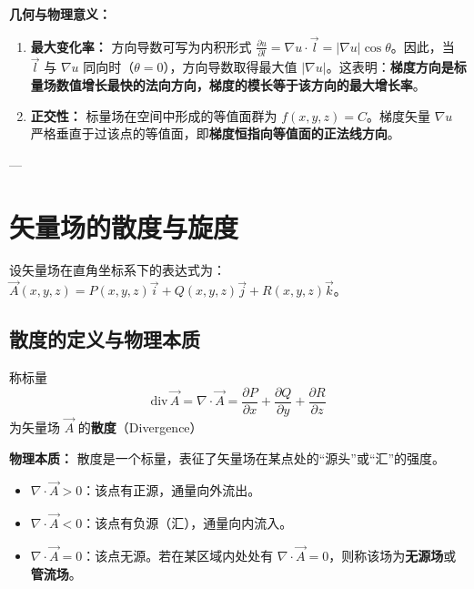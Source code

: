 \textbf{几何与物理意义：}
\begin{enumerate}
	\item \textbf{最大变化率：} 方向导数可写为内积形式 $\frac{\partial u}{\partial l} = \nabla u \cdot \vec{l} = |\nabla u| \cos\theta$。因此，当 $\vec{l}$ 与 $\nabla u$ 同向时（$\theta=0$），方向导数取得最大值 $|\nabla u|$。这表明：\textbf{梯度方向是标量场数值增长最快的法向方向，梯度的模长等于该方向的最大增长率}。
	\item \textbf{正交性：} 标量场在空间中形成的等值面群为 $f(x, y, z) = C$。梯度矢量 $\nabla u$ 严格垂直于过该点的等值面，即\textbf{梯度恒指向等值面的正法线方向}。
\end{enumerate}

---

\section{矢量场的散度与旋度}

设矢量场在直角坐标系下的表达式为：$\vec{A}(x, y, z) = P(x, y, z)\vec{i} + Q(x, y, z)\vec{j} + R(x, y, z)\vec{k}$。

\subsection{散度的定义与物理本质}
\begin{tcolorbox}[colback=blue!5!white, colframe=blue!75!black, title=定义 \thechapter.3 \quad 散度]
	称标量
	$$ \text{div}\,\vec{A} = \nabla \cdot \vec{A} = \frac{\partial P}{\partial x} + \frac{\partial Q}{\partial y} + \frac{\partial R}{\partial z} $$
	为矢量场 $\vec{A}$ 的\textbf{散度}（Divergence）
\end{tcolorbox}

\textbf{物理本质：} 散度是一个标量，表征了矢量场在某点处的“源头”或“汇”的强度。
\begin{itemize}
	\item $\nabla \cdot \vec{A} > 0$：该点有正源，通量向外流出。
	\item $\nabla \cdot \vec{A} < 0$：该点有负源（汇），通量向内流入。
	\item $\nabla \cdot \vec{A} = 0$：该点无源。若在某区域内处处有 $\nabla \cdot \vec{A} = 0$，则称该场为\textbf{无源场}或\textbf{管流场}。
\end{itemize}

